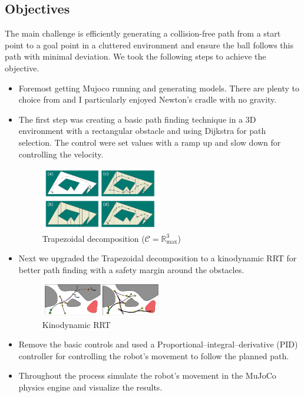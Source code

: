 \documentclass[12pt]{article}
\begin{document}
\subsection{Objectives}
The main challenge is efficiently generating a collision-free path from a start point to a goal point in a cluttered environment and ensure the ball follows this path with minimal deviation. We took the following steps to achieve the objective.
\begin{itemize}
    \item Foremost getting Mujoco running and generating models. There are plenty to choice from and I particularly enjoyed Newton's cradle with no gravity. 
    \item The first step was creating a basic path finding technique in a 3D environment with a rectangular obstacle and using Dijkstra for path selection. The control were set values with a ramp up and slow down for controlling the velocity. 
    \begin{figure}[h!]
      \centering
      \includegraphics[width=0.5\textwidth]{./images/trapezoidal.png}
      \caption{Trapezoidal decomposition (\(\mathcal{C} = \mathbb{R}^3_{\text{max}}\))}
      \label{fig:sample_image}
    \end{figure}
    \item Next we upgraded the Trapezoidal decomposition to a kinodynamic RRT for better path finding with a safety margin around the obstacles. 
    \begin{figure}[h!]
    \centering
      \includegraphics[width=0.5\textwidth]{./images/kinodyanmics.png}
      \caption{Kinodynamic RRT}
      \label{fig:sample_image}
    \end{figure}
    \item Remove the basic controls and used a Proportional–integral–derivative (PID) controller for controlling the robot's movement to follow the planned path.
    \item Throughout the process simulate the robot's movement in the MuJoCo physics engine and visualize the results.
\end{itemize}
\end{document}
